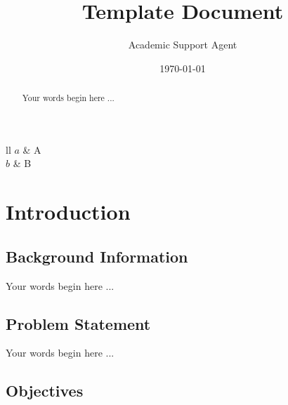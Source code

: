 \documentclass{article}
\title{Template Document}
\author{Academic Support Agent}
\date{\today}
\begin{document}
\maketitle

\maketitle
\begin{abstract}

Your words begin here ...

\end{abstract}










\listofsymbols                             %
{ll}{
	$a$ & A	\\
	$b$ & B	
}



\chapter{Introduction} \label{Chapter:introduction}

\section{Background Information}\label{background-information}

Your words begin here ...

\section{Problem Statement}\label{problem-statement}

Your words begin here ...

\section{Objectives}\label{objectives}
\end{document}

